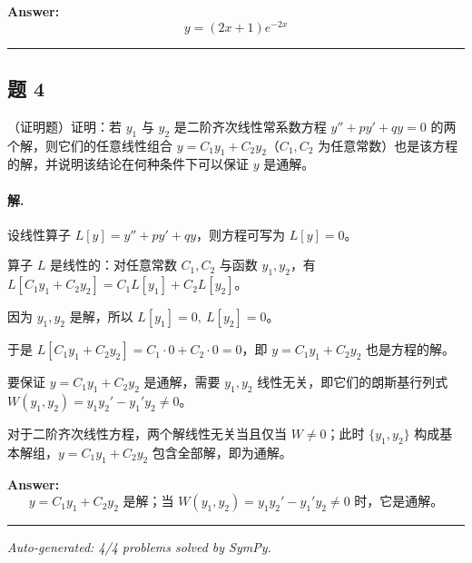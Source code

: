 \documentclass[12pt, a4paper]{article}
\newcommand{\problem}[1]{\subsection*{题 #1}}
\newcommand{\solution}{\paragraph{解.}}
\begin{document}
\textbf{Answer:}
\[\boxed{y = \left(2 x + 1\right) e^{- 2 x}}\]

\vspace{1em}
\hrule
\vspace{1em}

\problem{4}

（证明题）证明：若 $y_1$ 与 $y_2$ 是二阶齐次线性常系数方程 $y'' + py' + qy = 0$ 的两个解，则它们的任意线性组合 $y = C_1 y_1 + C_2 y_2$（$C_1, C_2$ 为任意常数）也是该方程的解，并说明该结论在何种条件下可以保证 $y$ 是通解。

\solution

设线性算子 $L[y] = y'' + py' + qy$，则方程可写为 $L[y]=0$。

算子 $L$ 是线性的：对任意常数 $C_1,C_2$ 与函数 $y_1,y_2$，有 $L[C_1 y_1 + C_2 y_2] = C_1 L[y_1] + C_2 L[y_2]$。

因为 $y_1,y_2$ 是解，所以 $L[y_1]=0,\ L[y_2]=0$。

于是 $L[C_1 y_1 + C_2 y_2] = C_1\cdot 0 + C_2\cdot 0 = 0$，即 $y=C_1 y_1 + C_2 y_2$ 也是方程的解。

要保证 $y=C_1 y_1 + C_2 y_2$ 是通解，需要 $y_1,y_2$ 线性无关，即它们的朗斯基行列式 $W(y_1,y_2)=y_1 y_2' - y_1' y_2 \neq 0$。

对于二阶齐次线性方程，两个解线性无关当且仅当 $W \neq 0$；此时 $\{y_1,y_2\}$ 构成基本解组，$y=C_1 y_1 + C_2 y_2$ 包含全部解，即为通解。

\textbf{Answer:}
\[\boxed{y = C_1 y_1 + C_2 y_2 \text{ 是解；当 } W(y_1,y_2)=y_1 y_2' - y_1' y_2 \neq 0 \text{ 时，它是通解。}}\]

\vspace{1em}
\hrule
\vspace{1em}


\vspace{2em}
\noindent\textit{Auto-generated: 4/4 problems solved by SymPy.}
\end{document}
